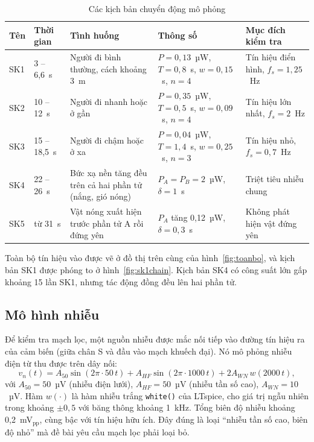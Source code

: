 \begin{table}[!htb]
\centering
\caption{Các kịch bản chuyển động mô phỏng}
\label{tab:kichban}
\small
\begin{tabularx}{\textwidth}{@{}p{1.1cm}p{1.7cm}p{4.0cm}p{3.3cm}L@{}}
\toprule
\textbf{Tên} & \textbf{Thời gian} & \textbf{Tình huống} & \textbf{Thông số} & \textbf{Mục đích kiểm tra} \\ \midrule
SK1 & 3 -- 6,6~s & Người đi bình thường, cách khoảng 3~m & $P=0{,}13$~µW, $T=0{,}8$~s, $w=0{,}15$~s, $n=4$ & Tín hiệu điển hình, $f_s = 1{,}25$~Hz \\
SK2 & 10 -- 12~s & Người đi nhanh hoặc ở gần & $P=0{,}35$~µW, $T=0{,}5$~s, $w=0{,}09$~s, $n=4$ & Tín hiệu lớn nhất, $f_s = 2$~Hz \\
SK3 & 15 -- 18,5~s & Người đi chậm hoặc ở xa & $P=0{,}04$~µW, $T=1{,}4$~s, $w=0{,}25$~s, $n=3$ & Tín hiệu nhỏ, $f_s = 0{,}7$~Hz \\
SK4 & 22 -- 26~s & Bức xạ nền tăng đều trên cả hai phần tử (nắng, gió nóng) & $P_A=P_B=2$~µW, $\delta=1$~s & Triệt tiêu nhiễu chung \\
SK5 & từ 31~s & Vật nóng xuất hiện trước phần tử A rồi đứng yên & $P_A$ tăng 0,12~µW, $\delta=0{,}3$~s & Không phát hiện vật đứng yên \\
\bottomrule
\end{tabularx}
\end{table}

Toàn bộ tín hiệu vào được vẽ ở đồ thị trên cùng của hình~\ref{fig:toanbo}, và kịch bản SK1 được phóng to ở hình~\ref{fig:sk1chain}. Kịch bản SK4 có công suất lớn gấp khoảng 15 lần SK1, nhưng tác động đồng đều lên hai phần tử.


\subsection{Mô hình nhiễu}

Để kiểm tra mạch lọc, một nguồn nhiễu được mắc nối tiếp vào đường tín hiệu ra của cảm biến (giữa chân S và đầu vào mạch khuếch đại). Nó mô phỏng nhiễu điện từ thu được trên dây nối:
\begin{equation}
  v_n(t) = A_{50}\sin(2\pi\cdot 50\,t) + A_{HF}\sin(2\pi\cdot 1000\,t) + 2A_{WN}\,w(2000\,t),
  \label{eq:noise}
\end{equation}
với $A_{50} = 50$~µV (nhiễu điện lưới), $A_{HF} = 50$~µV (nhiễu tần số cao), $A_{WN} = 10$~µV. Hàm $w(\cdot)$ là hàm nhiễu trắng \texttt{white()} của LTspice, cho giá trị ngẫu nhiên trong khoảng $\pm 0{,}5$ với băng thông khoảng 1~kHz. Tổng biên độ nhiễu khoảng 0,2~mV$_\text{pp}$, cùng bậc với tín hiệu hữu ích. Đây đúng là loại ``nhiễu tần số cao, biên độ nhỏ'' mà đề bài yêu cầu mạch lọc phải loại bỏ.
